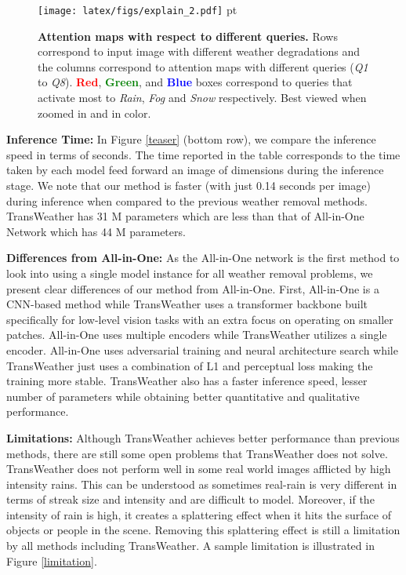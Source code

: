 \documentclass[10pt,twocolumn,letterpaper]{article}
\begin{document}
\begin{figure}[htbp]
	\centering
	\texttt{[image: latex/figs/explain\_2.pdf]} 
	 pt
	\caption{\textbf{Attention maps with respect to different queries.} Rows correspond to input image with different weather degradations and the columns correspond to attention maps with different queries (\textit{Q1} to \textit{Q8}). \textbf{\textcolor{red}{Red}}, \textbf{\textcolor{green}{Green}}, and \textbf{\textcolor{blue}{Blue}} boxes correspond to queries that activate most to \textit{Rain}, \textit{Fog} and \textit{Snow} respectively. Best viewed when zoomed in and in color.   }
	\label{explain}
	
\end{figure}


\noindent \textbf{Inference Time:} In Figure \ref{teaser} (bottom row), we compare the inference speed in terms of seconds. The time reported in the table corresponds to the time taken by each model feed forward an image of dimensions  during the inference stage. We note that our method is faster (with just 0.14 seconds per image) during inference when compared to the previous weather removal methods. TransWeather has 31 M parameters which are less than that of All-in-One Network which has 44 M parameters.






\noindent \textbf{Differences from All-in-One:} As the All-in-One network \cite{li2020all} is the first method to look into using a  single model instance for all weather removal problems, we present clear differences of our method from All-in-One. First, All-in-One is a CNN-based method while TransWeather uses a transformer backbone built specifically for low-level vision tasks with an extra focus on operating on smaller patches. All-in-One uses multiple encoders while TransWeather utilizes a single encoder. All-in-One uses adversarial training and neural architecture search while TransWeather just uses a combination of L1 and perceptual loss making the training more stable. TransWeather also has a faster inference speed, lesser number of parameters while obtaining better quantitative and qualitative performance.

\noindent \textbf{Limitations:} Although TransWeather achieves better performance than previous methods, there are still some open problems that TransWeather does not solve.  TransWeather does not perform well in some real world images afflicted by high intensity rains. This can be understood as sometimes real-rain is very different in terms of streak size and intensity and are difficult to model. Moreover, if the intensity of rain is high, it creates a splattering effect when it hits the surface of objects or people in the scene. Removing this splattering effect is still a limitation by all methods including TransWeather. A sample limitation is illustrated in Figure  \ref{limitation}.
\end{document}
